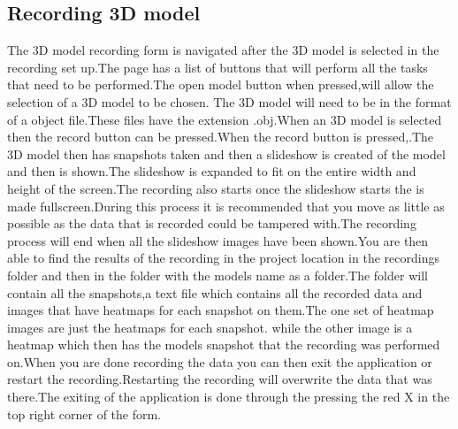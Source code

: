 \subsection{Recording 3D model}
The 3D model recording form is navigated after the 3D model is selected in the recording set up.The page has a list of buttons that will perform all the tasks that need to be performed.The open model button when pressed,will allow the selection of a 3D model to be chosen. The 3D model will need to be in the format of a object file.These files have the extension .obj.When an 3D model is selected then the record button can be pressed.When the record button is pressed,.The 3D model then has snapshots taken and then a slideshow is created of the model and then is shown.The slideshow is expanded to fit on the entire width and height of the screen.The recording also starts once the slideshow starts the is made fullscreen.During this process it is recommended that you move as little as possible as the data that is recorded could be tampered with.The recording process will end when all the slideshow images have been shown.You are then able to find the results of the recording in the project location in the recordings folder and then in the folder with the models name as a folder.The folder will contain all the snapshots,a text file which contains all the recorded data and images that have heatmaps for each snapshot on them.The one set of heatmap images are just the heatmaps for each snapshot. while the other image is a heatmap which then has the models snapshot that the recording was performed on.When you are done recording the data you can then exit the application or restart the recording.Restarting the recording will overwrite the data  that was there.The exiting of the application is done through the pressing the red X in the top right corner of the form.
